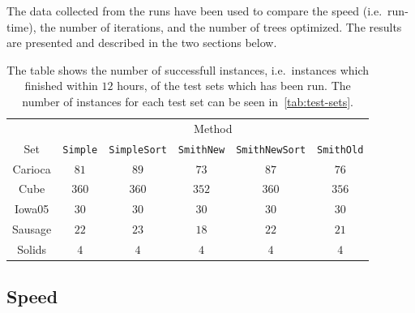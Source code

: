 
The data collected from the runs have been used to compare the speed (i.e.\
run-time), the number of iterations, and the number of trees optimized. The
results are presented and described in the two sections below.

\begin{table}[htbp]
  \centering
  \begin{tabular}{cccccc}
    \toprule
            & \multicolumn{5}{c}{Method}                               \\
    \cmidrule(l){2-6}
    Set     & \texttt{Simple} 
            & \texttt{SimpleSort}
            & \texttt{SmithNew} 
            & \texttt{SmithNewSort}
            & \texttt{SmithOld}                                        \\
    \cmidrule(r){1-1}\cmidrule(l){2-6}
    Carioca & $81$   & $89$       & $73$     & $87$         & $76$     \\
    Cube    & $360$  & $360$      & $352$    & $360$        & $356$    \\
    Iowa05  & $30$   & $30$       & $30$     & $30$         & $30$     \\
    Sausage & $22$   & $23$       & $18$     & $22$         & $21$     \\
    Solids  & $4$    & $4$        & $4$      & $4$          & $4$      \\
    \bottomrule
  \end{tabular}
  \caption[Successfull test runs]{The table shows the number of successfull
    instances, i.e.\ instances which finished within $12$ hours, of the test
    sets which has been run. The number of instances for each test set can be
    seen in~\cref{tab:test-sets}.\label{tab:set-success}}
\end{table}

\subsection{Speed}
\label{sec:speed}

